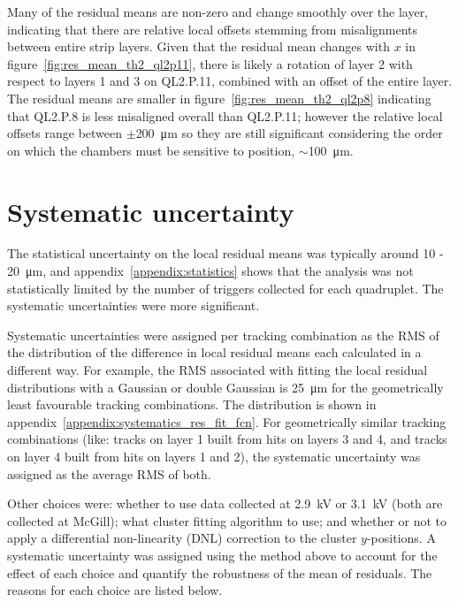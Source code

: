 Many of the residual means are non-zero and change smoothly over the layer, indicating that there are relative local offsets stemming from misalignments between entire strip layers. Given that the residual mean changes with $x$ in figure~\ref{fig:res_mean_th2_ql2p11}, there is likely a rotation of layer 2 with respect to layers 1 and 3 on QL2.P.11, combined with an offset of the entire layer. The residual means are smaller in figure~\ref{fig:res_mean_th2_ql2p8} indicating that QL2.P.8 is less misaligned overall than QL2.P.11; however the relative local offsets range between $\pm$\SI{200}{\micro\meter} so they are still significant considering the order on which the chambers must be sensitive to position, $\sim$\SI{100}{\micro\meter}.

\section{Systematic uncertainty}
\label{sec:cosmics_sys_uncerts}

The statistical uncertainty on the local residual means was typically around \SI{10}{} - \SI{20}{\micro\meter}, and appendix~\ref{appendix:statistics} shows that the analysis was not statistically limited by the number of triggers collected for each quadruplet. The systematic uncertainties were more significant. 

Systematic uncertainties were assigned per tracking combination as the RMS of the distribution of the difference in local residual means each calculated in a different way. For example, the RMS associated with fitting the local residual distributions with a Gaussian or double Gaussian is \SI{25}{\micro\meter} for the geometrically least favourable tracking combinations. The distribution is shown in appendix~\ref{appendix:systematics_res_fit_fcn}. For geometrically similar tracking combinations (like: tracks on layer 1 built from hits on layers 3 and 4, and tracks on layer 4 built from hits on layers 1 and 2), the systematic uncertainty was assigned as the average RMS of both.

Other choices were: whether to use data collected at 2.9~kV or 3.1~kV (both are collected at McGill); what cluster fitting algorithm to use; and whether or not to apply a differential non-linearity (DNL) correction to the cluster $y$-positions. A systematic uncertainty was assigned using the method above to account for the effect of each choice and quantify the robustness of the mean of residuals. The reasons for each choice are listed below.

